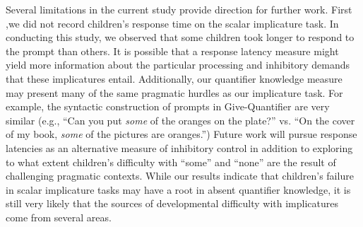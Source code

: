 \documentclass[man]{apa2}
\begin{document}
{Several limitations in the current study provide direction for further work. First ,we did not record children's response time on the scalar implicature task. In conducting this study, we observed that some children took longer to respond to the prompt than others. It is possible that a response latency measure might yield more information about the particular processing and inhibitory demands that these implicatures entail. Additionally, our quantifier knowledge measure \cite{barner2009} may present many of the same pragmatic hurdles as our implicature task. For example, the syntactic construction of prompts in Give-Quantifier are very similar (e.g., ``Can you put \emph{some} of the oranges on the plate?'' vs. ``On the cover of my book, \emph{some} of the pictures are oranges.'') Future work will pursue response latencies as an alternative measure of inhibitory control in addition to exploring to what extent children's difficulty with ``some'' and ``none'' are the result of challenging pragmatic contexts. While our results indicate that children's failure in scalar implicature tasks may have a root in absent quantifier knowledge, it is still very likely that the sources of developmental difficulty with implicatures come from several areas.





}
\end{document}
